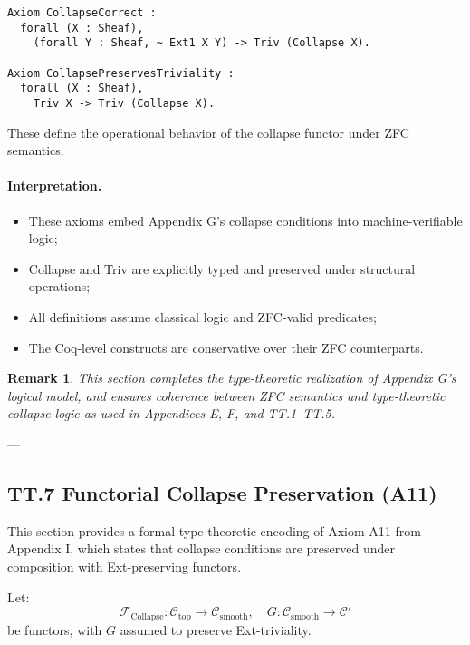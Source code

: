 \documentclass[11pt]{article}
\newtheorem{remark}[theorem]{Remark}
\begin{document}
\noindent
\begin{lstlisting}[language=Coq, breaklines=true]
Axiom CollapseCorrect :
  forall (X : Sheaf),
    (forall Y : Sheaf, ~ Ext1 X Y) -> Triv (Collapse X).

Axiom CollapsePreservesTriviality :
  forall (X : Sheaf),
    Triv X -> Triv (Collapse X).
\end{lstlisting}


These define the operational behavior of the collapse functor under ZFC semantics.

\paragraph{Interpretation.}

\begin{itemize}
  \item These axioms embed Appendix G’s collapse conditions into machine-verifiable logic;
  \item Collapse and Triv are explicitly typed and preserved under structural operations;
  \item All definitions assume classical logic and ZFC-valid predicates;
  \item The Coq-level constructs are conservative over their ZFC counterparts.
\end{itemize}

\begin{remark}
This section completes the type-theoretic realization of Appendix G’s logical model,  
and ensures coherence between ZFC semantics and type-theoretic collapse logic  
as used in Appendices E, F, and TT.1–TT.5.
\end{remark}

---

\subsection*{TT.7 Functorial Collapse Preservation (A11)}

This section provides a formal type-theoretic encoding of Axiom A11 from Appendix I,  
which states that collapse conditions are preserved under composition with Ext-preserving functors.

Let:
\[
\mathcal{F}_{\mathrm{Collapse}} : \mathcal{C}_{\mathrm{top}} \to \mathcal{C}_{\mathrm{smooth}},
\quad
G : \mathcal{C}_{\mathrm{smooth}} \to \mathcal{C}'
\]
be functors, with \( G \) assumed to preserve Ext-triviality.
\end{document}
